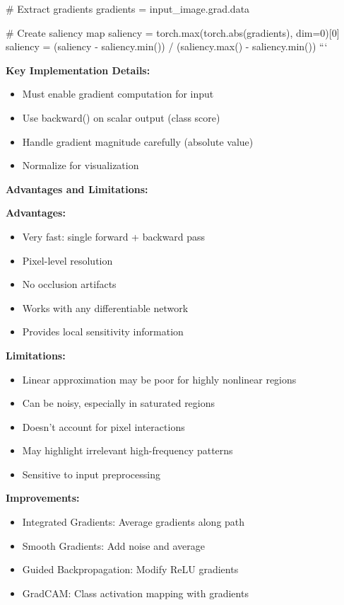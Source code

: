 \documentclass[12pt]{article}
\newcommand{\explanation}[1]{{\color{explanationcolor}#1}}
\begin{document}
\begin{enumerate}[(a)]
{{    # Extract gradients
    gradients = input_image.grad.data
    
    # Create saliency map
    saliency = torch.max(torch.abs(gradients), dim=0)[0]
    saliency = (saliency - saliency.min()) / (saliency.max() - saliency.min())
    ```
    
    \textbf{Key Implementation Details:}
    \begin{itemize}
        \item Must enable gradient computation for input
        \item Use backward() on scalar output (class score)
        \item Handle gradient magnitude carefully (absolute value)
        \item Normalize for visualization
    \end{itemize}
    }
    
    \textbf{Advantages and Limitations:}
    
    \explanation{
    \textbf{Advantages:}
    \begin{itemize}
        \item Very fast: single forward + backward pass
        \item Pixel-level resolution
        \item No occlusion artifacts
        \item Works with any differentiable network
        \item Provides local sensitivity information
    \end{itemize}
    
    \textbf{Limitations:}
    \begin{itemize}
        \item Linear approximation may be poor for highly nonlinear regions
        \item Can be noisy, especially in saturated regions
        \item Doesn't account for pixel interactions
        \item May highlight irrelevant high-frequency patterns
        \item Sensitive to input preprocessing
    \end{itemize}
    
    \textbf{Improvements:}
    \begin{itemize}
        \item Integrated Gradients: Average gradients along path
        \item Smooth Gradients: Add noise and average
        \item Guided Backpropagation: Modify ReLU gradients
        \item GradCAM: Class activation mapping with gradients
    \end{itemize}
    }
    
}
\end{enumerate}
\end{document}
